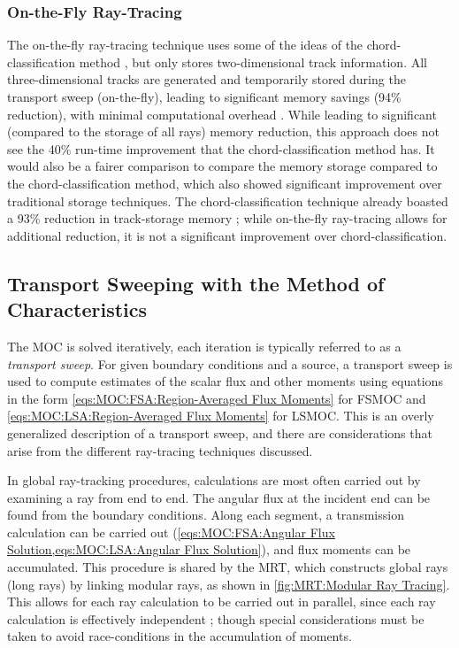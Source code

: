 {{{        \subsubsection{On-the-Fly Ray-Tracing}{\label{ssec:RT:On-the-Fly Ray-Tracing}
          The on-the-fly ray-tracing technique \cite{Gunow2016} uses some of the ideas of the chord-classification method \cite{Sciannandrone2016}, but only stores two-dimensional track information.
          All three-dimensional tracks are generated and temporarily stored during the transport sweep (on-the-fly), leading to significant memory savings (94\% reduction), with minimal computational overhead \cite{Gunow2016}.
          While leading to significant (compared to the storage of all rays) memory reduction, this approach does not see the 40\% run-time improvement that the chord-classification method has.
          It would also be a fairer comparison to compare the memory storage compared to the chord-classification method, which also showed significant improvement over traditional storage techniques.
          The chord-classification technique already boasted a 93\% reduction in track-storage memory \cite{Sciannandrone2016}; while on-the-fly ray-tracing allows for additional reduction, it is not a significant improvement over chord-classification.
        }
      }

      \subsection{Transport Sweeping with the Method of Characteristics}{\label{ssec:RT:Transport Sweeping with the Method of Characteristics}
        The \ac{MOC} is solved iteratively, each iteration is typically referred to as a \emph{transport sweep}.
        For given boundary conditions and a source, a transport sweep is used to compute estimates of the scalar flux and other moments using equations in the form \cref{eqs:MOC:FSA:Region-Averaged Flux Moments} for \ac{FSMOC} and \cref{eqs:MOC:LSA:Region-Averaged Flux Moments} for \ac{LSMOC}.
        This is an overly generalized description of a transport sweep, and there are considerations that arise from the different ray-tracing techniques discussed.

        In global ray-tracking procedures, calculations are most often carried out by examining a ray from end to end.
        The angular flux at the incident end can be found from the boundary conditions.
        Along each segment, a transmission calculation can be carried out (\cref{eqs:MOC:FSA:Angular Flux Solution,eqs:MOC:LSA:Angular Flux Solution}), and flux moments can be accumulated.
        This procedure is shared by the \ac{MRT}, which constructs global rays (long rays) by linking modular rays, as shown in \cref{fig:MRT:Modular Ray Tracing}.
        This allows for each ray calculation to be carried out in parallel, since each ray calculation is effectively independent \cite{Kochunas2013}; though special considerations must be taken to avoid race-conditions in the accumulation of moments.

}}}
